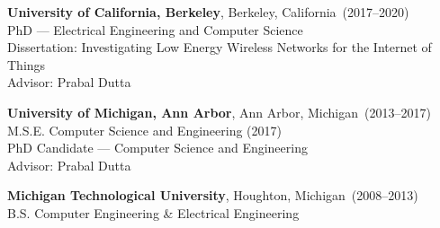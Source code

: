 \documentclass{article}
\begin{document}
{\bf University of California, Berkeley}, Berkeley, California~(2017--2020) \\
PhD --- Electrical Engineering and Computer Science \\
Dissertation: Investigating Low Energy Wireless Networks for the Internet of Things \\
Advisor: Prabal Dutta

{\bf University of Michigan, Ann Arbor}, Ann Arbor, Michigan~(2013--2017) \\
M.S.E. Computer Science and Engineering (2017) \\
PhD Candidate --- Computer Science and Engineering \\
Advisor: Prabal Dutta

{\bf Michigan Technological University}, Houghton, Michigan~(2008--2013) \\
B.S. Computer Engineering \& Electrical Engineering \\
\end{document}
